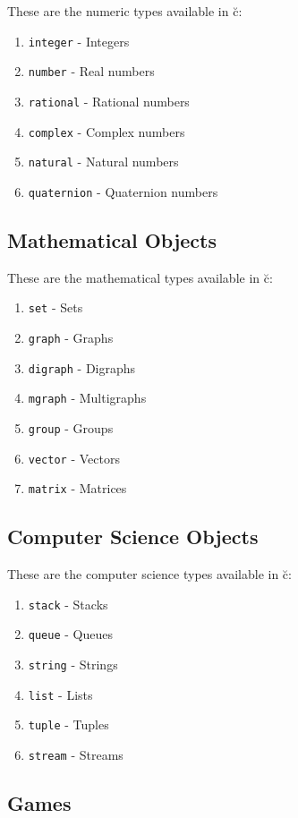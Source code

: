 \documentclass{article}
\begin{document}
These are the numeric types available in \u{c}:
\begin{enumerate}
    \item \texttt{integer} - Integers
    \item \texttt{number} - Real numbers
    \item \texttt{rational} - Rational numbers
    \item \texttt{complex} - Complex numbers
    \item \texttt{natural} - Natural numbers
    \item \texttt{quaternion} - Quaternion numbers
\end{enumerate}

\subsection{Mathematical Objects}

These are the mathematical types available in \u{c}:
\begin{enumerate}
    \item \texttt{set} - Sets
    \item \texttt{graph} - Graphs
    \item \texttt{digraph} - Digraphs
    \item \texttt{mgraph} - Multigraphs
    \item \texttt{group} - Groups
    \item \texttt{vector} - Vectors
    \item \texttt{matrix} - Matrices
\end{enumerate}

\subsection{Computer Science Objects}

These are the computer science types available in \u{c}:
\begin{enumerate}
    \item \texttt{stack} - Stacks
    \item \texttt{queue} - Queues
    \item \texttt{string} - Strings
    \item \texttt{list} - Lists
    \item \texttt{tuple} - Tuples
    \item \texttt{stream} - Streams
\end{enumerate}

\subsection{Games}
\end{document}
